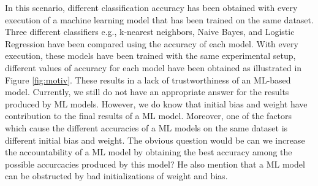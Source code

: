 In this scenario, different classification accuracy has been obtained with every execution of a machine learning model that has been trained on the same dataset. Three different classifiers e.g., k-nearest neighbors, Naive Bayes, and Logistic Regression have been compared using the accuracy of each model. With every execution, these models have been trained with the same experimental setup, different values of accuracy for each model have been obtained as illustrated in Figure \ref{fig:motiv}. These results in a lack of trustworthiness of an ML-based model. Currently, we still do not have an appropriate answer for the results produced by ML models. However, we do know that initial bias and weight have contribution to the final results of a ML model. Moreover, one of the factors which cause the different accuracies of a ML models on the same dataset is different initial bias and weight. The obvious question would be can we increase the accountability of a ML model by obtaining the best accuracy among the possible accurcacies produced by this model? He\etal \cite{he2015delving} also mention that a ML model can be obstructed by bad initializations of weight and bias. 
